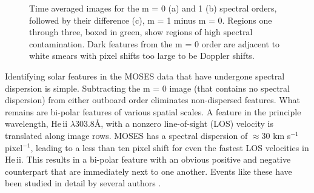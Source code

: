 \documentclass[]{solarphysics}
\begin{document}
\begin{article}
\begin{figure}
		

		
		\caption{Time averaged images for the m = 0 (a) and 1 (b) spectral orders, followed by their difference (c), m = 1 minus m = 0.  Regions one through three, boxed in green, show regions of high spectral contamination. Dark features from the m = 0 order are adjacent to white smears with pixel shifts too large to be Doppler shifts.}
		\label{fig:moses_super}
	\end{figure}

	

	Identifying solar features in the MOSES data that have undergone spectral dispersion is simple. Subtracting the m = 0 image (that contains no spectral dispersion) from either outboard order eliminates non-dispersed features. What remains are bi-polar features of various spatial scales.  A feature in the principle wavelength, He\,{\sc ii} $\lambda 303.8$\AA, with a nonzero line-of-sight (LOS) velocity is translated along image rows.    MOSES has a spectral dispersion of $\approx 30$ km s$^{-1}$ pixel$^{-1}$, leading to a less than ten pixel shift for even the fastest LOS velocities in He\,{\sc ii}. This results in a bi-polar feature with an obvious positive and negative counterpart that are immediately next to one another. Events like these have been studied in detail by several authors \citep{Fox2010,Rust2017,Courrier2018}.
	

\end{article}
\end{document}
